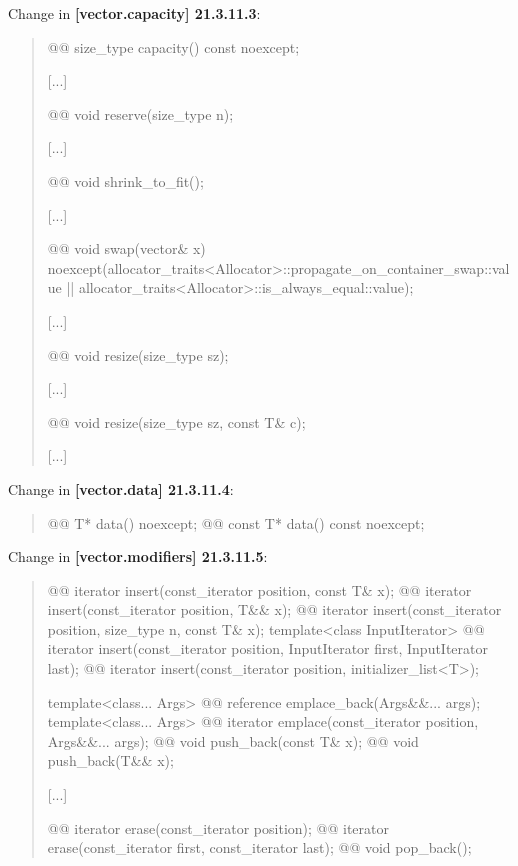 \documentclass{wg21}
\begin{document}
Change in \textbf{[vector.capacity] 21.3.11.3}:
\begin{quote}
\begin{itemdecl}
@@ size_type capacity() const noexcept;
\end{itemdecl}
[...]
\begin{itemdecl}
@@ void reserve(size_type n);
\end{itemdecl}
[...]
\begin{itemdecl}
@@ void shrink_to_fit();
\end{itemdecl}
[...]
\begin{itemdecl}
@@ void swap(vector& x)
  noexcept(allocator_traits<Allocator>::propagate_on_container_swap::value ||
           allocator_traits<Allocator>::is_always_equal::value);
\end{itemdecl}
[...]
\begin{itemdecl}
@@ void resize(size_type sz);
\end{itemdecl}
[...]
\begin{itemdecl}
@@ void resize(size_type sz, const T& c);
\end{itemdecl}
[...]
\end{quote}

Change in \textbf{[vector.data] 21.3.11.4}:
\begin{quote}
\begin{itemdecl}
@@ T*         data() noexcept;
@@ const T*   data() const noexcept;
\end{itemdecl}
\end{quote}

Change in \textbf{[vector.modifiers] 21.3.11.5}:
\begin{quote}
\begin{itemdecl}
@@ iterator insert(const_iterator position, const T& x);
@@ iterator insert(const_iterator position, T&& x);
@@ iterator insert(const_iterator position, size_type n, const T& x);
template<class InputIterator>
  @@ iterator insert(const_iterator position, InputIterator first, InputIterator last);
@@ iterator insert(const_iterator position, initializer_list<T>);

template<class... Args> @@ reference emplace_back(Args&&... args);
template<class... Args> @@ iterator emplace(const_iterator position, Args&&... args);
@@ void push_back(const T& x);
@@ void push_back(T&& x);
\end{itemdecl}
[...]
\begin{itemdecl}
@@ iterator erase(const_iterator position);
@@ iterator erase(const_iterator first, const_iterator last);
@@ void pop_back();
\end{itemdecl}
\end{quote}
\end{document}
